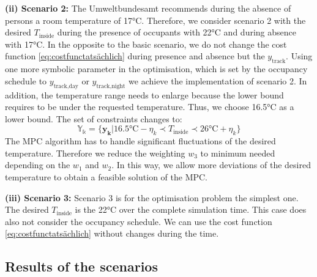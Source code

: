 \textbf{(ii) Scenario 2:}\newline
The Umweltbundesamt \cite{Umweltbundesamt.7.10.2021} recommends during the absence of persons a room temperature of 17°C. Therefore, we consider scenario 2 with the desired $T_\text{inside}$ during the presence of occupants with 22°C and during absence with 17°C. In the opposite to the basic scenario, we do not change the cost function \ref{eq:costfunctatsächlich} during presence and absence but the $y_\text{track}$. Using one more symbolic parameter in the optimisation, which is set by the occupancy schedule to $y_\text{track,day}$ or $y_\text{track,night}$ we achieve the implementation of scenario 2. In addition, the temperature range needs to enlarge because the lower bound requires to be under the requested temperature. Thus, we choose 16.5°C as a lower bound. The set of constraints changes to:
\begin{equation}
    \label{ConstraintYScenario2}
    \mathbb{Y_k} = \{\mathbf{y_k}| 16.5 \text{°C} - \eta_k \prec T_\text{inside} \prec 26 \text{°C}+ \eta_k\} 
\end{equation}
The MPC algorithm has to handle significant fluctuations of the desired temperature. Therefore we reduce the weighting $w_\text{3}$ to minimum needed depending on the $w_\text{1}$ and $w_\text{2}$. In this way, we allow more deviations of the desired temperature to obtain a feasible solution of the MPC. \newline 

\textbf{(iii) Scenario 3:}\newline
Scenario 3 is for the optimisation problem the simplest one. The desired $T_\text{inside}$ is the 22°C over the complete simulation time. This case does also not consider the occupancy schedule. We can use the cost function \ref{eq:costfunctatsächlich} without changes during the time.

\subsection{Results of the scenarios}
\label{subsec:Results of the scenarios}
    \begin{figure}[h]
           \centering
        \def\svgwidth{0.85\textwidth}
        
        \caption{}
         \label{fig:TemperaturverlaufScenarien}
    \end{figure}
    
    \begin{figure}[h]
           \centering
        \def\svgwidth{1\textwidth}
        
        \caption{}
         \label{fig:HeizverlaufGewichte}
    \end{figure}
    
